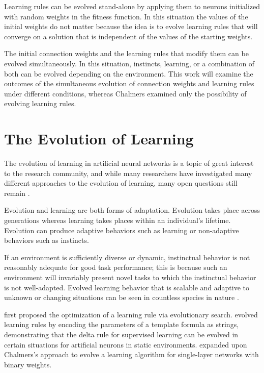 \documentclass[master]{outhesis}
\begin{document}
Learning rules can be evolved stand-alone by applying them to neurons initialized with random weights in the fitness function.
In this situation the values of the initial weights do not matter because the idea is to evolve learning rules that will converge on a solution that is independent of the values of the starting weights.

The initial connection weights and the learning rules that modify them can be evolved simultaneously.
In this situation, instincts, learning, or a combination of both can be evolved depending on the environment.
This work will examine the outcomes of the simultaneous evolution of connection weights and learning rules under different conditions,
whereas Chalmers examined only the possibility of evolving learning rules.

\section{The Evolution of Learning}

The evolution of learning in artificial neural networks is a topic of great interest to the research community, 
and while many researchers have investigated many different approaches to the evolution of learning,
many open questions still remain \citep{Soltoggio:2017bl}.

Evolution and learning are both forms of adaptation.
Evolution takes place across generations whereas learning takes places within an individual's lifetime.
Evolution can produce adaptive behaviors such as learning or non-adaptive behaviors such as instincts.

If an environment is sufficiently diverse or dynamic, instinctual behavior is not reasonably adequate for good task performance;
this is because such an environment will invariably present novel tasks to which the instinctual behavior is not well-adapted.
Evolved learning behavior that is scalable and adaptive to unknown or changing situations can be seen in countless species in nature \citep{Shah:2015hs}.

\citet{Bengio:1990aa} first proposed the optimization of a learning rule via evolutionary search.
\citet{Chalmers:1990aa} evolved learning rules by encoding the parameters of a template formula as strings, demonstrating that the delta rule for supervised learning can be evolved in certain situations for artificial neurons in static environments.
\citet{Fontanari:1991aa} expanded upon Chalmers's approach to evolve a learning algorithm for single-layer networks with binary weights.
\end{document}
